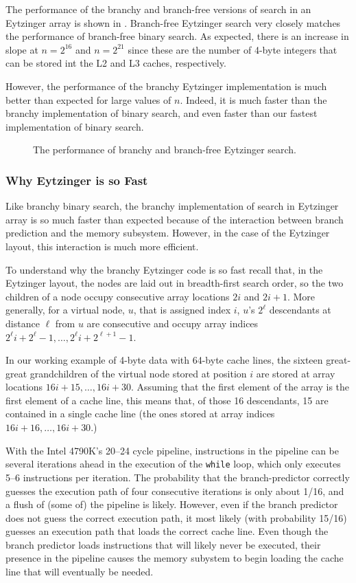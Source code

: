 \documentclass{patmorin}
\begin{document}
The performance of the branchy and branch-free versions of search
in an Eytzinger array is shown in .  Branch-free
Eytzinger search very closely matches the performance of branch-free
binary search. As expected, there is an increase in slope at $n=2^{16}$
and $n=2^{21}$ since these are the number of 4-byte integers that can
be stored int the L2 and L3 caches, respectively.

However, the performance of the branchy Eytzinger implementation is
much better than expected for large values of $n$. Indeed, it is much
faster than the branchy implementation of binary search, and even
faster than our fastest implementation of binary search.

\begin{figure}
   \caption{The performance of branchy and branch-free Eytzinger search.}
\end{figure}

\subsubsection{Why Eytzinger is so Fast}

Like branchy binary search, the branchy implementation of search in
Eytzinger array is so much faster than expected because of the interaction
between branch prediction and the memory subsystem.  However, in the
case of the Eytzinger layout, this interaction is much more efficient.

To understand why the branchy Eytzinger code is so fast recall that,
in the Eytzinger layout, the nodes are laid out in breadth-first
search order,  so the two children of a node occupy consecutive array
locations $2i$ and $2i+1$. More generally, for a virtual node, $u$,
that is assigned index $i$, $u$'s $2^\ell$ descendants at distance
$\ell$ from $u$ are consecutive and occupy array indices $2^\ell i +
2^{\ell}-1,\ldots,2^{\ell} i + 2^{\ell+1}-1$.

In our working example of 4-byte data with 64-byte cache lines, the
sixteen great-great grandchildren of the virtual node stored at position
$i$ are stored at array locations $16i+15,\ldots,16i+30$.  Assuming that
the first element of the array is the first element of a cache line,
this means that, of those 16 descendants, 15 are contained in a single
cache line (the ones stored at array indices $16i+16,\ldots,16i+30$.)

With the Intel 4790K's 20--24 cycle pipeline, instructions in
the pipeline can be several iterations ahead in the execution of the
\texttt{while} loop, which only executes 5--6 instructions per
iteration.  The probability that the branch-predictor correctly guesses
the execution path of four consecutive iterations is only about 1/16,
and a flush of (some of) the pipeline is likely.  However, even if the
branch predictor does not guess the correct execution path, it most likely
(with probability 15/16) guesses an execution path that loads the correct
cache line.  Even though the branch predictor loads instructions that will
likely never be executed, their presence in the pipeline causes the memory
subystem to begin loading the cache line that will eventually be needed.
\end{document}
